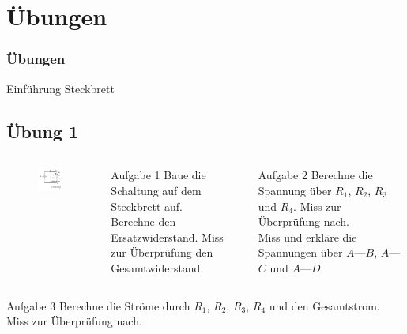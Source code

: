 \section*{Übungen}

\begin{frame}
  \frametitle{Übungen}
  \pause
  \begin{center}
    Einführung Steckbrett
  \end{center}
\end{frame}

\subsection*{Übung 1}
\begin{frame}
  \begin{columns}
    \begin{center}
      \begin{figure}
        \includegraphics[width=1\textwidth]{e04/Uebung1_Schaltplan.pdf}
      \end{figure}
    \end{center}
    \begin{alertblock}{Aufgabe 1}
      Baue die Schaltung auf dem Steckbrett auf.\\
      Berechne den Ersatzwiderstand. Miss zur Überprüfung den Gesamtwiderstand.
    \end{alertblock}
    \begin{alertblock}{Aufgabe 2}
      Berechne die Spannung über $R_1$, $R_2$, $R_3$ und $R_4$. Miss zur Überprüfung nach.\\
      Miss und erkläre die Spannungen über $A$---$B$, $A$---$C$ und $A$---$D$.
    \end{alertblock}
  \end{columns}
  \begin{alertblock}{Aufgabe 3}
    Berechne die Ströme durch $R_1$, $R_2$, $R_3$, $R_4$ und den Gesamtstrom. Miss zur Überprüfung nach.
  \end{alertblock}
\end{frame}

